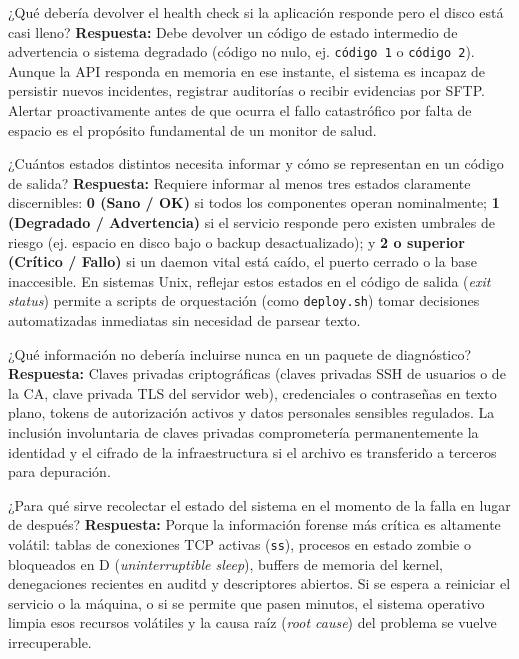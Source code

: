 \documentclass[10pt,a4paper]{article}
\begin{document}
\begin{pregunta}{¿Qué debería devolver el health check si la aplicación responde pero el disco está casi lleno?}
    \textbf{Respuesta:} Debe devolver un código de estado intermedio de advertencia o sistema degradado (código no nulo, ej. \texttt{código 1} o \texttt{código 2}). Aunque la API responda en memoria en ese instante, el sistema es incapaz de persistir nuevos incidentes, registrar auditorías o recibir evidencias por SFTP. Alertar proactivamente antes de que ocurra el fallo catastrófico por falta de espacio es el propósito fundamental de un monitor de salud.
\end{pregunta}

\begin{pregunta}{¿Cuántos estados distintos necesita informar y cómo se representan en un código de salida?}
    \textbf{Respuesta:} Requiere informar al menos tres estados claramente discernibles: \textbf{0 (Sano / OK)} si todos los componentes operan nominalmente; \textbf{1 (Degradado / Advertencia)} si el servicio responde pero existen umbrales de riesgo (ej. espacio en disco bajo o backup desactualizado); y \textbf{2 o superior (Crítico / Fallo)} si un daemon vital está caído, el puerto cerrado o la base inaccesible. En sistemas Unix, reflejar estos estados en el código de salida (\textit{exit status}) permite a scripts de orquestación (como \texttt{deploy.sh}) tomar decisiones automatizadas inmediatas sin necesidad de parsear texto.
\end{pregunta}

\begin{pregunta}{¿Qué información no debería incluirse nunca en un paquete de diagnóstico?}
    \textbf{Respuesta:} Claves privadas criptográficas (claves privadas SSH de usuarios o de la CA, clave privada TLS del servidor web), credenciales o contraseñas en texto plano, tokens de autorización activos y datos personales sensibles regulados. La inclusión involuntaria de claves privadas comprometería permanentemente la identidad y el cifrado de la infraestructura si el archivo es transferido a terceros para depuración.
\end{pregunta}

\begin{pregunta}{¿Para qué sirve recolectar el estado del sistema en el momento de la falla en lugar de después?}
    \textbf{Respuesta:} Porque la información forense más crítica es altamente volátil: tablas de conexiones TCP activas (\texttt{ss}), procesos en estado zombie o bloqueados en D (\textit{uninterruptible sleep}), buffers de memoria del kernel, denegaciones recientes en auditd y descriptores abiertos. Si se espera a reiniciar el servicio o la máquina, o si se permite que pasen minutos, el sistema operativo limpia esos recursos volátiles y la causa raíz (\textit{root cause}) del problema se vuelve irrecuperable.
\end{pregunta}
\end{document}
